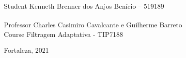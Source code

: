 \vspace{25pt}

\begin{flushleft}
	\begin{tabbing}
		Student \qquad Kenneth Brenner dos Anjos Benício – 519189\\
	   \qquad\qquad\qquad\= \\
		Professor\> Charles Casimiro Cavalcante e Guilherme Barreto\\
		Course \> Filtragem Adaptativa - TIP7188\\
	\end{tabbing}
\end{flushleft}

\vspace{25pt}

\begin{center}
    Fortaleza, 2021
\end{center}